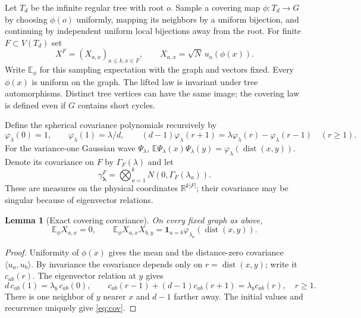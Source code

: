 \documentclass[11pt]{article}
\numberwithin{equation}{section}
\newtheorem{lemma}[theorem]{Lemma}
\theoremstyle{definition}
\theoremstyle{remark}
\newcommand{\R}{\mathbb R}
\newcommand{\E}{\mathbb E}
\newcommand{\one}{\mathbf 1}
\newcommand{\Ga}{\Gamma}
\begin{document}
Let $T_d$ be the infinite regular tree with root $o$. Sample a covering
map $\phi:T_d\to G$ by choosing $\phi(o)$ uniformly, mapping its
neighbors by a uniform bijection, and continuing by independent uniform
local bijections away from the root. For finite $F\subset V(T_d)$ set
\begin{equation}\label{eq:X}
 X^F=(X_{a,x})_{a\leq k,x\in F},\qquad
 X_{a,x}=\sqrt N\,u_a(\phi(x)).
\end{equation}
Write $\E_\phi$ for this sampling expectation with the graph and vectors
fixed. Every $\phi(x)$ is uniform on the graph. The lifted law is
invariant under tree automorphisms. Distinct tree vertices can have the
same image; the covering law is defined even if $G$ contains short cycles.

Define the spherical covariance polynomials recursively by
\begin{equation}\label{eq:recurrence}
 \varphi_\lambda(0)=1,\qquad
 \varphi_\lambda(1)=\lambda/d,\qquad
 (d-1)\varphi_\lambda(r+1)=\lambda\varphi_\lambda(r)-\varphi_\lambda(r-1)
 \quad(r\geq1).
\end{equation}
For the variance-one Gaussian wave $\Psi_\lambda$,
$\E\Psi_\lambda(x)\Psi_\lambda(y)=\varphi_\lambda(\operatorname{dist}(x,y))$.
Denote its covariance on $F$ by $\Ga_F(\lambda)$ and let
\begin{equation}\label{eq:target}
 \gamma^F_{\boldsymbol\lambda}
 =\bigotimes_{a=1}^k N(0,\Ga_F(\lambda_a)).
\end{equation}
These are measures on the physical coordinates $\R^{k|F|}$; their
covariance may be singular because of eigenvector relations.

\begin{lemma}[Exact covering covariance]\label{lem:cov}
On every fixed graph as above,
\begin{equation}\label{eq:cov}
 \E_\phi X_{a,x}=0,\qquad
 \E_\phi X_{a,x}X_{b,y}
 =\one_{a=b}\varphi_{\lambda_a}(\operatorname{dist}(x,y)).
\end{equation}
\end{lemma}
\begin{proof}
Uniformity of $\phi(x)$ gives the mean and the distance-zero covariance
$\langle u_a,u_b\rangle$. By invariance the covariance depends only on
$r=\operatorname{dist}(x,y)$; write it $c_{ab}(r)$. The eigenvector
relation at $y$ gives
\[
 d\,c_{ab}(1)=\lambda_b\,c_{ab}(0),\qquad
 c_{ab}(r-1)+(d-1)c_{ab}(r+1)=\lambda_b c_{ab}(r),\quad r\geq1.
\]
There is one neighbor of $y$ nearer $x$ and $d-1$ farther away.
The initial values and recurrence uniquely give \eqref{eq:cov}.
\end{proof}
\end{document}
